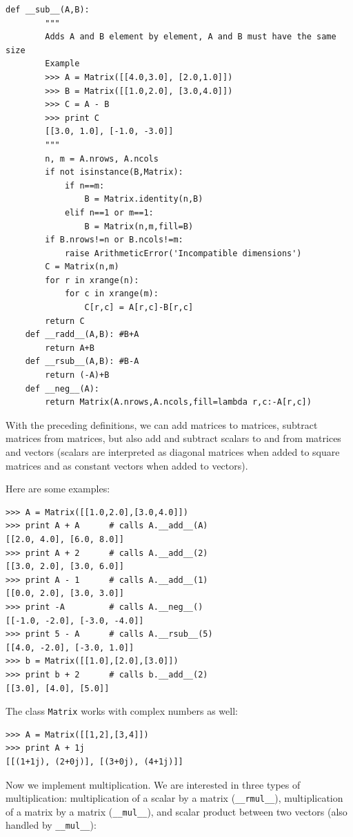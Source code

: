 \documentclass[justified,sixbynine]{tufte-book}
\def\ft{\small\tt}
\theoremstyle{plain}%
\theoremstyle{definition}
\theoremstyle{remark}
\begin{document}
\begin{fullwidth}
\begin{lstlisting}[caption={in file: {\ft nlib.py}}]
    def __sub__(A,B):
        """
        Adds A and B element by element, A and B must have the same size
        Example
        >>> A = Matrix([[4.0,3.0], [2.0,1.0]])
        >>> B = Matrix([[1.0,2.0], [3.0,4.0]])
        >>> C = A - B
        >>> print C
        [[3.0, 1.0], [-1.0, -3.0]]
        """
        n, m = A.nrows, A.ncols
        if not isinstance(B,Matrix):
            if n==m:
                B = Matrix.identity(n,B)
            elif n==1 or m==1:
                B = Matrix(n,m,fill=B)
        if B.nrows!=n or B.ncols!=m:
            raise ArithmeticError('Incompatible dimensions')
        C = Matrix(n,m)
        for r in xrange(n):
            for c in xrange(m):
                C[r,c] = A[r,c]-B[r,c]
        return C
    def __radd__(A,B): #B+A
        return A+B
    def __rsub__(A,B): #B-A
        return (-A)+B
    def __neg__(A):
        return Matrix(A.nrows,A.ncols,fill=lambda r,c:-A[r,c])
\end{lstlisting}
With the preceding definitions, we can add matrices to matrices, subtract matrices from matrices, but also add and subtract scalars to and from matrices and vectors
(scalars are interpreted as diagonal matrices when added to square matrices and as constant vectors when added to vectors).

Here are some examples:

\begin{lstlisting}[caption={in file: {\ft nlib.py}}]
>>> A = Matrix([[1.0,2.0],[3.0,4.0]])
>>> print A + A      # calls A.__add__(A)
[[2.0, 4.0], [6.0, 8.0]]
>>> print A + 2      # calls A.__add__(2)
[[3.0, 2.0], [3.0, 6.0]]
>>> print A - 1      # calls A.__add__(1)
[[0.0, 2.0], [3.0, 3.0]]
>>> print -A         # calls A.__neg__()
[[-1.0, -2.0], [-3.0, -4.0]]
>>> print 5 - A      # calls A.__rsub__(5)
[[4.0, -2.0], [-3.0, 1.0]]
>>> b = Matrix([[1.0],[2.0],[3.0]])
>>> print b + 2      # calls b.__add__(2)
[[3.0], [4.0], [5.0]]
\end{lstlisting}

The class {\ft Matrix} works with complex numbers as well:
\begin{lstlisting}[caption={in file: {\ft nlib.py}}]
>>> A = Matrix([[1,2],[3,4]])
>>> print A + 1j
[[(1+1j), (2+0j)], [(3+0j), (4+1j)]]
\end{lstlisting}


Now we implement multiplication. We are interested in three types of multiplication: multiplication of a scalar by a matrix ({\ft \_\_rmul\_\_}), multiplication of a matrix by a matrix ({\ft \_\_mul\_\_}), and scalar product between two vectors (also handled by {\ft \_\_mul\_\_}):


\end{fullwidth}
\end{document}
